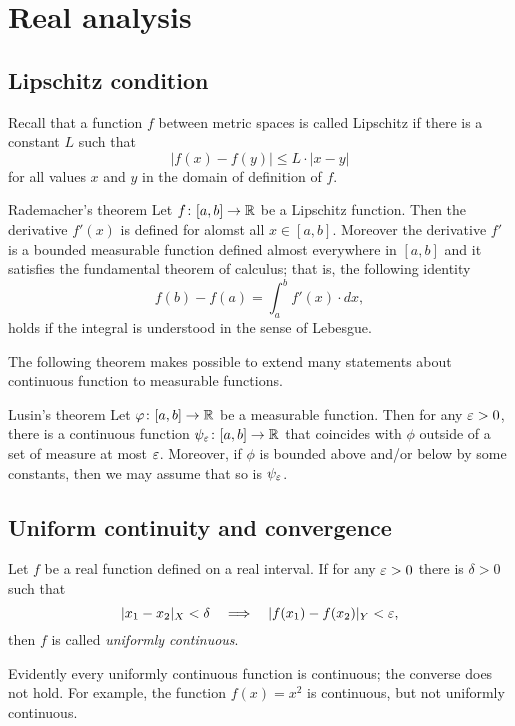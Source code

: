 \chapter{Real analysis}

\section*{Lipschitz condition}

Recall that a function $f$ between metric spaces is called Lipschitz if there is a constant $L$ such that 
\[|f(x)-f(y)|\le L\cdot|x-y|\]
for all values $x$ and $y$ in the domain of definition of $f$.

\begin{thm}{Rademacher's theorem}\label{thm:rademacher}
Let $f\colon[a,b]\to\mathbb{R}$ be a Lipschitz function.
Then the derivative $f'(x)$ is defined for alomst all $x\in [a,b]$.
Moreover the derivative $f'$ is a bounded measurable function defined almost everywhere in $[a,b]$ and it satisfies the fundamental theorem of calculus; that is, the following identity 
\[f(b)-f(a)=\int_a^b f'(x)\cdot dx,\]
holds if the integral is understood in the sense of Lebesgue.
\end{thm}

The following theorem makes possible to extend many statements about continuous function to measurable functions.

\begin{thm}{Lusin's theorem}\label{thm:lusin}
Let $\varphi\colon[a,b]\to \mathbb{R}$ be a measurable function.
Then for any $\varepsilon>0$, there is a continuous function $\psi_\varepsilon\colon[a,b]\to \mathbb{R}$ that coincides with $\phi$ outside of a set of measure at most $\varepsilon$.
Moreover, if $\phi$ is bounded above and/or below by some constants, then we may assume that so is $\psi_\varepsilon$.  
\end{thm}

\section*{Uniform continuity and convergence}

Let $f$ be a real function defined on a real interval.
If  for any $\varepsilon>0$ there is $\delta>0$ such that 
\[|x_1-x_2|_X<\delta\quad\Longrightarrow\quad |f(x_1)-f(x_2)|_Y<\varepsilon,\]
then $f$ is called \emph{uniformly continuous}.

Evidently every uniformly continuous function is continuous;
the converse does not hold.
For example, the function $f(x)=x^2$ is continuous, but not uniformly continuous.

